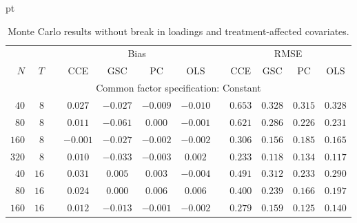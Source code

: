 \documentclass[12pt,fleqn]{article}
\begin{document}
  \pagebreak
  
  
  
  \pagebreak
  
  \begin{table}[H]
  \caption{Monte Carlo results without break in loadings and treatment-affected covariates.}\label{tab:mc_no_break}
   pt
  \centering
  \par
  \begin{tabular}{rrcccccccccc}
  \hline\hline
   {\small $$} & {\small $$} & {\small $$} & \multicolumn{4}{c}{\small Bias} & {\small $$} & \multicolumn{4}{c}{\small RMSE}\\ \cline{4-7}\cline{9-12}
   {\small $N$} & {\small $T$} & {\small $$} & {\small CCE} & {\small GSC} & {\small PC} & {\small OLS} & {\small $$} & {\small CCE} & {\small GSC} & {\small PC} & {\small OLS} \\\hline
   \multicolumn{12}{c}{\small Common factor specification: Constant}\\
   {\small $40$} & {\small $8$} & {\small $$} & {\small $0.027$} & {\small $-0.027$} & {\small $-0.009$} & {\small $-0.010$} & {\small $$} & {\small $0.653$} & {\small $0.328$} & {\small $0.315$} & {\small $0.328$} \\
   {\small $80$} & {\small $8$} & {\small $$} & {\small $0.011$} & {\small $-0.061$} & {\small $0.000$} & {\small $-0.001$} & {\small $$} & {\small $0.621$} & {\small $0.286$} & {\small $0.226$} & {\small $0.231$} \\
   {\small $160$} & {\small $8$} & {\small $$} & {\small $-0.001$} & {\small $-0.027$} & {\small $-0.002$} & {\small $-0.002$} & {\small $$} & {\small $0.306$} & {\small $0.156$} & {\small $0.185$} & {\small $0.165$} \\
   {\small $320$} & {\small $8$} & {\small $$} & {\small $0.010$} & {\small $-0.033$} & {\small $-0.003$} & {\small $0.002$} & {\small $$} & {\small $0.233$} & {\small $0.118$} & {\small $0.134$} & {\small $0.117$} \\
   {\small $40$} & {\small $16$} & {\small $$} & {\small $0.031$} & {\small $0.005$} & {\small $0.003$} & {\small $-0.004$} & {\small $$} & {\small $0.491$} & {\small $0.312$} & {\small $0.233$} & {\small $0.290$} \\
   {\small $80$} & {\small $16$} & {\small $$} & {\small $0.024$} & {\small $0.000$} & {\small $0.006$} & {\small $0.006$} & {\small $$} & {\small $0.400$} & {\small $0.239$} & {\small $0.166$} & {\small $0.197$} \\
   {\small $160$} & {\small $16$} & {\small $$} & {\small $0.012$} & {\small $-0.013$} & {\small $-0.001$} & {\small $-0.002$} & {\small $$} & {\small $0.279$} & {\small $0.159$} & {\small $0.125$} & {\small $0.140$} \\

\end{tabular}
\end{table}
\end{document}
